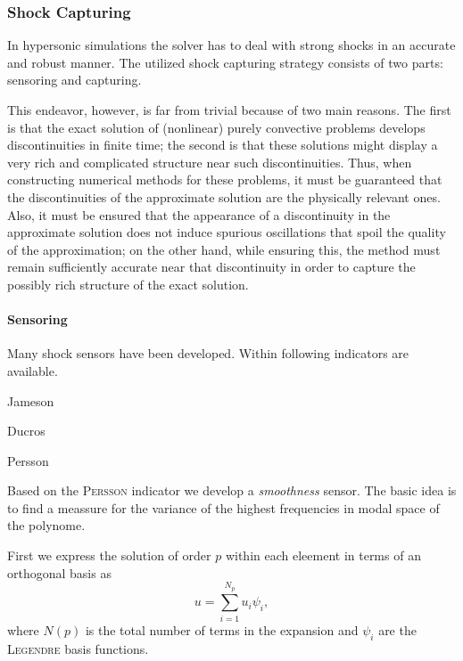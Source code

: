 \subsubsection{Shock Capturing}
\label{sec:shock-capturing}
In hypersonic simulations the solver has to deal with strong shocks in an
accurate and robust manner. The utilized shock capturing strategy consists of
two parts: sensoring and capturing.

This endeavor, however, is far from trivial because of two main reasons.
The first is that the exact solution of (nonlinear) purely convective problems
develops discontinuities in finite time; the second is that these solutions might
display a very rich and complicated structure near such discontinuities. Thus,
when constructing numerical methods for these problems, it must be 
guaranteed that the discontinuities of the approximate solution are the physically
relevant ones. Also, it must be ensured that the appearance of a discontinuity
in the approximate solution does not induce spurious oscillations that spoil
the quality of the approximation; on the other hand, while ensuring this, the
method must remain sufficiently accurate near that discontinuity in order to
capture the possibly rich structure of the exact solution.

\paragraph{Sensoring}
Many shock sensors have been developed. Within \FLEXI following indicators
are available.

\begin{description}
    \item[Jameson]\cite{jameson1981}
    \item[Ducros] \cite{ducros1999}
    \item[Persson] \cite{persson2006}
\end{description}

Based on the \textsc{Persson} indicator we develop a \emph{smoothness} sensor.
The basic idea is to find a meassure for the variance of the highest
frequencies in modal space of the polynome.

First we express the solution of order $p$ within each eleement in terms of
an orthogonal basis as
\begin{equation}
    u = \sum^{N_p}_{i=1} u_i \psi_i,
\end{equation}
where $N(p)$ is the total number of terms in the expansion and $\psi_i$ are the
\textsc{Legendre} basis functions.


